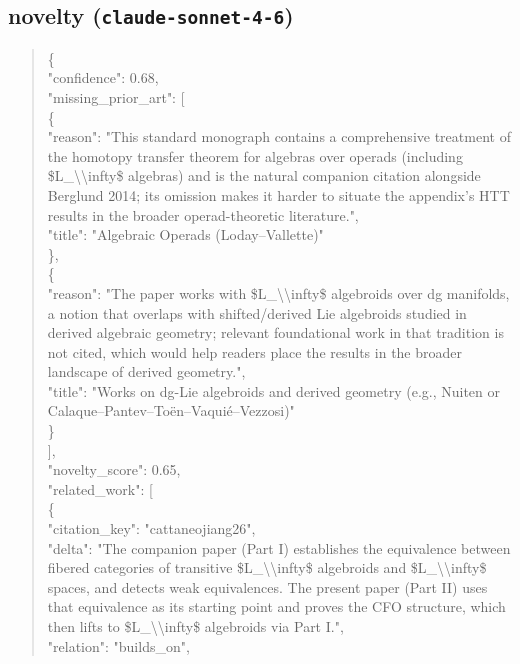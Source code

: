 \documentclass[11pt]{article}
\begin{document}
\subsection*{novelty (\texttt{claude-sonnet-4-6})}
\begin{quote}\small\ttfamily\raggedright
\{\\
  "confidence": 0.68,\\
  "missing\_prior\_art": [\\
    \{\\
      "reason": "This standard monograph contains a comprehensive treatment of the homotopy transfer theorem for algebras over operads (including \$L\_\textbackslash{}\textbackslash{}infty\$ algebras) and is the natural companion citation alongside Berglund 2014; its omission makes it harder to situate the appendix's HTT results in the broader operad-theoretic literature.",\\
      "title": "Algebraic Operads (Loday--Vallette)"\\
    \},\\
    \{\\
      "reason": "The paper works with \$L\_\textbackslash{}\textbackslash{}infty\$ algebroids over dg manifolds, a notion that overlaps with shifted/derived Lie algebroids studied in derived algebraic geometry; relevant foundational work in that tradition is not cited, which would help readers place the results in the broader landscape of derived geometry.",\\
      "title": "Works on dg-Lie algebroids and derived geometry (e.g., Nuiten or Calaque--Pantev--Toën--Vaquié--Vezzosi)"\\
    \}\\
  ],\\
  "novelty\_score": 0.65,\\
  "related\_work": [\\
    \{\\
      "citation\_key": "cattaneojiang26",\\
      "delta": "The companion paper (Part I) establishes the equivalence between fibered categories of transitive \$L\_\textbackslash{}\textbackslash{}infty\$ algebroids and \$L\_\textbackslash{}\textbackslash{}infty\$ spaces, and detects weak equivalences. The present paper (Part II) uses that equivalence as its starting point and proves the CFO structure, which then lifts to \$L\_\textbackslash{}\textbackslash{}infty\$ algebroids via Part I.",\\
      "relation": "builds\_on",\\

\end{quote}
\end{document}

